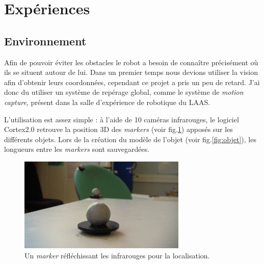 \section{Expériences}
\label{sec:exp}

\subsection{Environnement}
\label{sub:env}

Afin de pouvoir éviter les obstacles le robot a besoin de connaître précisément où ils se situent autour de lui. Dans un premier temps nous devions utiliser la vision afin d'obtenir leurs coordonnées, cependant ce projet a pris un peu de retard. 
J'ai donc du utiliser un système de repérage global, comme le système de \emph{motion capture}, présent dans la salle d'expérience de robotique du LAAS.

L'utilisation est assez simple : à l'aide de 10 caméras infrarouges, le logiciel Cortex2.0 retrouve la position 3D des \emph{markers} (voir fig.\ref{fig:marker}) apposés sur les différents objets. 
Lors de la création du modèle de l'objet (voir fig.\ref{fig:objet}), les longueurs entre les \emph{markers} sont sauvegardées.


\begin{figure}[h]
\begin{center}
\includegraphics[width=8.0cm]{images/marker_small.jpg}
\caption{Un \emph{marker} réfléchissant les infrarouges pour la localisation.}
\label{fig:marker}
\end{center}
\end{figure}

